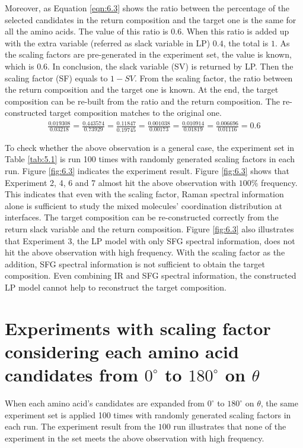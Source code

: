 Moreover, as Equation \ref{eqn:6.3} shows the ratio between the percentage of the selected candidates in the return composition and the target one is the same for all the amino acids. The value of this ratio is $0.6$. When this ratio is added up with the extra variable (referred as slack variable in LP) $0.4$, the total is $1$. As the scaling factors are pre-generated in the experiment set, the value is known, which is $0.6$. In conclusion, the slack variable (SV) is returned by LP. Then the scaling factor (SF) equals to $1 - SV$. From the scaling factor, the ratio between the return composition and the target one is known. At the end, the target composition can be re-built from the ratio and the return composition. The re-constructed target composition matches to the original one. \\

\begin{eqnarray} \label{eqn:6.3}
\frac{0.019308}{0.03218} = \frac{0.443574}{0.73929} = \frac{0.11847}{0.19745} =\frac{0.001038}{0.00173}  = \frac{0.010914}{0.01819} = \frac{0.006696}{0.01116} = 0.6
\end{eqnarray}

To check whether the above observation is a general case, the experiment set in Table \ref{tab:5.1} is run 100 times with randomly generated scaling factors in each run. Figure \ref{fig:6.3} indicates the experiment result. Figure \ref{fig:6.3} shows that Experiment 2, 4, 6 and 7 almost hit the above observation with $100\%$ frequency. This indicates that even with the scaling factor, Raman spectral information alone is sufficient to study the mixed molecules' coordination distribution at interfaces. The target composition can be re-constructed correctly from the return slack variable and the return composition. Figure \ref{fig:6.3} also illustrates that Experiment 3, the LP model with only SFG spectral information, does not hit the above observation with high frequency. With the scaling factor as the addition, SFG spectral information is not sufficient to obtain the target composition. Even combining IR and SFG spectral information, the constructed LP model cannot help to reconstruct the target composition. \\

\section{Experiments with scaling factor considering each amino acid candidates from $0^{\circ}$ to $180^{\circ}$ on $\theta$}
When each amino acid's candidates are expanded from $0^{\circ}$ to $180^{\circ}$ on $\theta$, the same experiment set is applied 100 times with randomly generated scaling factors in each run. The experiment result from the $100$ run illustrates that none of the experiment in the set meets the above observation with high frequency. \\

